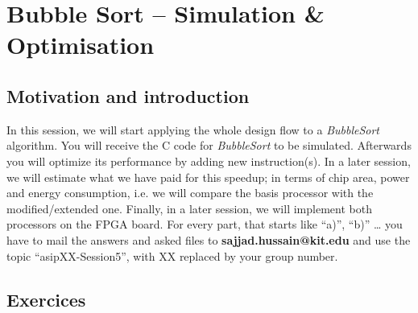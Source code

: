 \hypertarget{bubble-sort-simulation-optimisation}{%
\chapter*{Bubble Sort -- Simulation \& Optimisation}\label{bubble-sort-simulation-optimisation}}


\section*{Motivation and introduction}

In this session, we will start applying the whole design flow to a
\emph{BubbleSort} algorithm. You will receive the C code for
\emph{BubbleSort} to be simulated. Afterwards you will optimize its
performance by adding new instruction(s). In a later session, we will
estimate what we have paid for this speedup; in terms of chip area,
power and energy consumption, i.e. we will compare the basis processor
with the modified/extended one. Finally, in a later session, we will
implement both processors on the FPGA board. For every part, that starts
like ``a)'', ``b)'' \ldots{} you have to mail the answers and asked
files to \textbf{sajjad.hussain@kit.edu} and use the topic
``asipXX-Session5'', with XX replaced by your group number.

\section*{Exercices}

